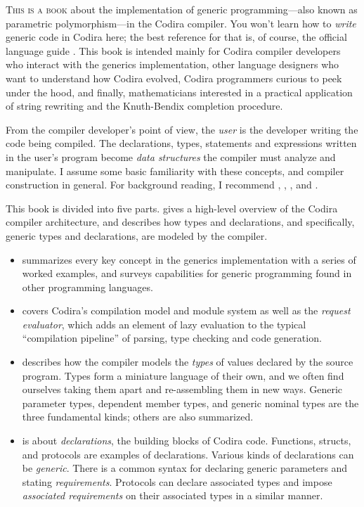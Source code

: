 \documentclass[../generics]{subfiles}
\begin{document}


\lettrine{T}{his is a book} about the implementation of generic programming---also known as parametric polymorphism---in the Codira compiler. You won't learn how to \emph{write} generic code in Codira here; the best reference for that is, of course, the official language guide \cite{tspl}. This book is intended mainly for Codira compiler developers who interact with the generics implementation, other language designers who want to understand how Codira evolved, Codira programmers curious to peek under the hood, and finally, mathematicians interested in a practical application of string rewriting and the Knuth-Bendix completion procedure.

From the compiler developer's point of view, the \emph{user} is the developer writing the code being compiled. The declarations, types, statements and expressions written in the user's program become \emph{data structures} the compiler must analyze and manipulate. I assume some basic familiarity with these concepts, and compiler construction in general. For background reading, I recommend \cite{muchnick1997advanced}, \cite{cooper2004engineering}, \cite{craftinginterpreter}, and \cite{incrementalracket}.

This book is divided into five parts.  gives a high-level overview of the Codira compiler architecture, and describes how types and declarations, and specifically, generic types and declarations, are modeled by the compiler.
\begin{itemize}
\item {} summarizes every key concept in the generics implementation with a series of worked examples, and surveys capabilities for generic programming found in other programming languages.
\item {} covers Codira's compilation model and module system as well as the \emph{request evaluator}, which adds an element of lazy evaluation to the typical ``compilation pipeline'' of parsing, type checking and code generation.
\item {} describes how the compiler models the \emph{types} of values declared by the source program. Types form a miniature language of their own, and we often find ourselves taking them apart and re-assembling them in new ways. Generic parameter types, dependent member types, and generic nominal types are the three fundamental kinds; others are also summarized.
\item {} is about \emph{declarations}, the building blocks of Codira code. Functions, structs, and protocols are examples of declarations. Various kinds of declarations can be \emph{generic}. There is a common syntax for declaring generic parameters and stating \emph{requirements}. Protocols can declare associated types and impose \emph{associated requirements} on their associated types in a similar manner.
\end{itemize}
\end{document}

